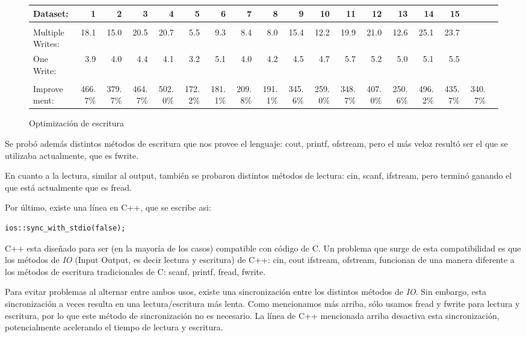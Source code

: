 \documentclass{article}
\begin{document}
\begin{figure*}[h]\centering
\scriptsize
\begin{adjustbox}{width=1.2\textwidth, center}
\begin{tabular}{|l|rrrrrrrrrrrrrrr|r|r|}\toprule
Dataset: &1 &2 &3 &4 &5 &6 &7 &8 &9 &10 &11 &12 &13 &14 &15 & \\
\hline \\
Multiple Writes: &18.1 &15.0 &20.5 &20.7 &5.5 &9.3 &8.4 &8.0 &15.4 &12.2 &19.9 &21.0 &12.6 &25.1 &23.7 & \\
One Write: &3.9 &4.0 &4.4 &4.1 &3.2 &5.1 &4.0 &4.2 &4.5 &4.7 &5.7 &5.2 &5.0 &5.1 &5.5 & \\
\hline \\
Improvement: &466.7\% &379.7\% &464.7\% &502.0\% &172.2\% &181.1\% &209.8\% &191.1\% &345.6\% &259.0\% &348.7\% &407.0\% &250.6\% &496.2\% &435.7\% &340.7\% \\
\bottomrule
\end{tabular}
\end{adjustbox}
\caption{Optimización de escritura}
\label{label_one_write}
\end{figure*}
Se probó además distintos métodos de escritura que nos provee el lenguaje: cout, printf, ofstream, pero el más veloz resultó ser el que se utilizaba actualmente, que es fwrite.

En cuanto a la lectura, similar al output, también se probaron distintos métodos de lectura: cin, scanf, ifstream, pero terminó ganando el que está actualmente que es fread.

Por último, existe una línea en C++, que se escribe asi:
\begin{lstlisting}
ios::sync_with_stdio(false);
\end{lstlisting}
\hspace{0.2cm} C++ esta diseñado para ser (en la mayoría de los casos) compatible con código de C. Un problema que surge de esta compatibilidad es que los métodos de \emph{IO} (Input Output, es decir lectura y escritura) de C++: cin, cout ifstream, ofstream, funcionan de una manera diferente a los métodos de escritura tradicionales de C: scanf, printf, fread, fwrite.

Para evitar problemas al alternar entre ambos usos, existe una sincronización entre los distintos métodos de \emph{IO}. Sin embargo, esta sincronización a veces resulta en una lectura/escritura más lenta. Como mencionamos más arriba, sólo usamos fread y fwrite para lectura y escritura, por lo que este método de sincronización no es necesario. La línea de C++ mencionada arriba desactiva esta sincronización, potencialmente acelerando el tiempo de lectura y escritura.
\end{document}
